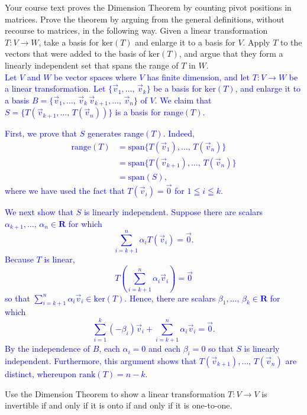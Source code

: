 \documentclass[a4paper,11pt]{article}
\newcommand{\R}{\mathbf{R}}
\newcommand{\BB}[1]{\textcolor{blue}{#1}}
\begin{document}
 Your course text proves the Dimension Theorem by
counting pivot positions in matrices. Prove the theorem by arguing from the
general definitions, without recourse to matrices, in the following way. Given a
linear transformation $T : V \rightarrow W$, take a basis for $\text{ker}(T)$
and enlarge it to a basis for $V$. Apply $T$ to the vectors that were added to
the basis of $\text{ker}(T)$, and argue that they form a linearly independent
set that spans the range of $T$ in $W$. \\

\BB{Let $V$ and $W$ be vector spaces where $V$ has finite dimension, and let $T
  : V \rightarrow W$ be a linear transformation. Let $\{\vec v_1,\dots,\,\vec
  v_k\}$ be a basis for $\text{ker}(T)$, and enlarge it to a basis $B=\{\vec
  v_1,\dots,\,\vec v_k\,\vec v_{k+1},\dots,\,\vec v_n\}$ of $V$. We claim that
  $S=\{T(\vec v_{k+1},\dots,\,T(\vec v_n))\}$ is a basis for $\text{range}(T)$.}

\BB{First, we prove that $S$ generates $\text{range}(T)$. Indeed,
  \begin{align*}
    \text{range}(T) &= \text{span}\{T(\vec v_1),\dots,\,T(\vec v_n)\} \\
                    &= \text{span}\{T(\vec v_{k+1}),\dots,\,T(\vec v_n)\} \\
                    &= \text{span}(S),
  \end{align*}
  where we have used the fact that $T(\vec v_i)=\vec 0$ for $1 \leqq i \leqq k$.}

\BB{We next show that $S$ is linearly independent. Suppose there are scalars
  $\alpha_{k+1},\dots,\,\alpha_n \in \R$ for which
  \[
    \sum_{i=k+1}^n \alpha_iT(\vec v_i) = \vec 0.
  \]
  Because $T$ is linear,
  \[
    T\left( \sum_{i=k+1}^n\alpha_i\vec v_i \right) = \vec 0
  \]
  so that $\sum_{i=k+1}^n\alpha_i\vec v_i \in \text{ker}(T)$. Hence, there are
  scalars $\beta_1,\dots,\,\beta_k \in \R$ for which
  \[
    \sum_{i=1}^k(-\beta_i)\vec v_i + \sum_{i=k+1}^n\alpha_i\vec v_i = \vec 0.
  \]
  By the independence of $B$, each $\alpha_i=0$ and each $\beta_i=0$ so that $S$
  is linearly independent. Furthermore, this argument shows that $T(\vec
  v_{k+1}),\dots,\,T(\vec v_n)$ are distinct, whereupon $\text{rank}(T)=n-k$. \\}

 Use the Dimension Theorem to show a linear
transformation $T: V \rightarrow V$ is invertible if and only if it is onto if
and only if it is one-to-one. \\
\end{document}
